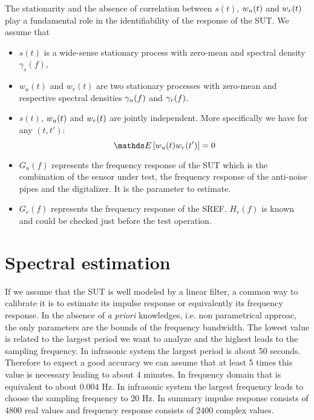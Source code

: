 The stationarity and the absence of correlation between $s(t)$, $w_{{u}}(t)$ and $w_{{r}}(t)$ play a fundamental  role in the identifiability of the response of the SUT. We assume that
\begin{itemize}
\item
$s(t)$ is a wide-sense stationary process with zero-mean and spectral density $\gamma_{s}(f)$,
\item
$w_{u}(t)$ and $w_{r}(t)$ are two  stationary processes with zero-mean and respective spectral densities $\gamma_{{u}}(f)$ and $\gamma_{{r}}(f)$. 
\item
$s(t)$,  $w_{{u}}(t)$ and $w_{{r}}(t)$ are jointly independent. More specifically we have for any $(t,t')$:
$$
 \esp{w_{\ut}(t)w_{r}(t')}=0
$$
\item
$G_{u}(f)$ represents the frequency response of the SUT which is the combination of the sensor under test, the frequency response of the anti-noise pipes and the digitalizer. It is the parameter to estimate.
\item
$G_{r}(f)$ represents the frequency response of the SREF. $H_{r}(f)$ is known and could be checked just before the test operation.
\end{itemize}



\section{Spectral estimation}
If we assume that the SUT is well modeled by a linear filter, a common way to calibrate it is to estimate its impulse response or equivalently its frequency response. In the absence of {\it a priori} knowledges, i.e. non parametrical approac, the only parameters are the bounds of the frequency bandwidth. The lowest value is related to the largest period we want to analyze and the highest leads to the sampling frequency. In infrasonic system the largest period is about 50 seconds. Therefore to expect a good accuracy we can assume that at least 5 times this value is necessary leading to about 4 minutes. In frequency domain that is equivalent to about $0.004$ Hz. In infrasonic system the largest frequency leads to choose the sampling frequency to $20$ Hz. In summary impulse response consists of $4800$ real values and frequency response consists of $2400$ complex values. 


